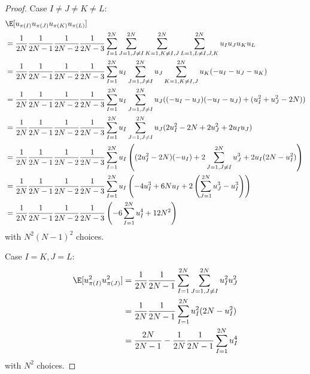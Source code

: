 \begin{proof}
  Case $I \neq J \neq K \neq L$: 
  \begin{align*}
    &\E[u_{\pi(I)} u_{\pi(J)} u_{\pi(K)} u_{\pi(L)}] \\
    &= \frac{1}{2N}\frac{1}{2N-1}\frac{1}{2N-2}\frac{1}{2N-3} 
    \sum_{I=1}^{2N} \sum_{J=1, J\neq I}^{2N} \sum_{K=1, K \neq I,J}^{2N} \sum_{L=1, L \neq I,J,K}^{2N} 
    u_{I} u_{J} u_{K} u_{L} \\
    &= \frac{1}{2N}\frac{1}{2N-1}\frac{1}{2N-2}\frac{1}{2N-3} 
    \sum_{I=1}^{2N} u_{I} \sum_{J=1, J\neq I}^{2N} u_{J} \sum_{K=1, K \neq
      I,J}^{2N} u_{K} (-u_{I}-u_{J}-u_{K}) \\
    &= \frac{1}{2N}\frac{1}{2N-1}\frac{1}{2N-2}\frac{1}{2N-3} 
    \sum_{I=1}^{2N} u_{I} \sum_{J=1, J\neq I}^{2N} u_{J} 
    ((-u_{I}-u_{J})(-u_{I}-u_{J})+(u_{I}^2+u_{J}^2-2N)) \\
    &= \frac{1}{2N}\frac{1}{2N-1}\frac{1}{2N-2}\frac{1}{2N-3} 
    \sum_{I=1}^{2N} u_{I} \sum_{J=1, J\neq I}^{2N} u_{J} 
    (2u_{I}^2-2N+2u_{J}^2+2u_{I}u_{J}) \\
    &= \frac{1}{2N}\frac{1}{2N-1}\frac{1}{2N-2}\frac{1}{2N-3} 
    \sum_{I=1}^{2N} u_{I} \left ( 
      (2u_{I}^2-2N)(-u_{I})+2\sum_{J=1, J\neq I}^{2N} u_{J}^3+2u_{I}(2N-u_{I}^2) 
    \right) \\
    &= \frac{1}{2N}\frac{1}{2N-1}\frac{1}{2N-2}\frac{1}{2N-3} 
    \sum_{I=1}^{2N} u_{I} \left ( 
      -4u_{I}^3 + 6Nu_{I} + 2\left (\sum_{J=1}^{2N}u_{J}^3 - u_{I}^3 \right )
    \right) \\
    &= \frac{1}{2N}\frac{1}{2N-1}\frac{1}{2N-2}\frac{1}{2N-3} 
    \left ( -6\sum_{I=1}^{2N}u_{I}^4+12N^2 \right )
  \end{align*}
  with $N^2(N-1)^2$ choices.
  
  Case $I=K, J=L$:
  \begin{align*}
    \E[u_{\pi(I)}^2 u_{\pi(J)}^2] &= \frac{1}{2N}\frac{1}{2N-1} \sum_{I=1}^{2N}
    \sum_{J=1, J\neq I}^{2N} u_{I}^2 u_{J}^2 \\
    &= \frac{1}{2N}\frac{1}{2N-1} \sum_{I=1}^{2N} u_{I}^2 (2N - u_{I}^2) \\
    &= \frac{2N}{2N-1}-\frac{1}{2N}\frac{1}{2N-1} \sum_{I=1}^{2N} u_{I}^4
  \end{align*}
  with $N^2$ choices.


\end{proof}
